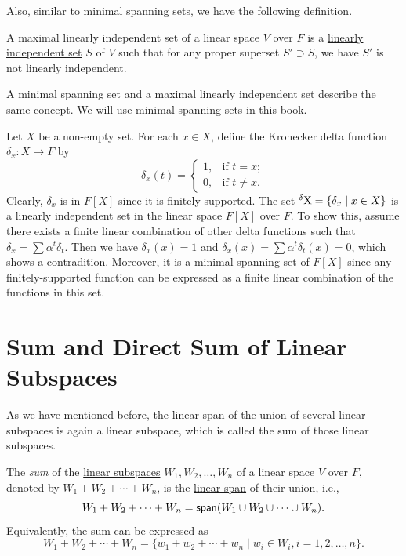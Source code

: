 Also, similar to minimal spanning sets, we have the following definition.

\begin{definition}\label{def:maximal_linearly_independent_set}
  A maximal linearly independent set of a linear space $V$ over $F$ is a \hyperref[def:linear_independent_set]{linearly independent set} $S$ of $V$ such that for any proper superset $S' \supset S$, we have $S'$ is not linearly independent.  
\end{definition}

\begin{remark}
  A minimal spanning set and a maximal linearly independent set describe the same concept. We will use minimal spanning sets in this book. 
\end{remark}

\begin{example}
  Let $X$ be a non-empty set. For each $x \in X$, define the Kronecker delta function $\delta_x \colon X \to F$ by
  \begin{equation}\label{eq:delta_function}
    \delta_x(t) = \begin{cases}
      1, & \text{if } t = x; \\
      0, & \text{if } t \neq x.
    \end{cases}
  \end{equation}
  Clearly, $\delta_x$ is in $F[X]$ since it is finitely supported. The set $\operatorname{{}^{\delta} X} = \{ \delta_x \mid x \in X \}$ is a linearly independent set in the linear space $F[X]$ over $F$. To show this, assume there exists a finite linear combination of other delta functions such that $\delta_x = \sum \alpha^t \delta_t$. Then we have $\delta_x(x) = 1$ and $\delta_x(x) = \sum \alpha^t \delta_t(x) = 0$, which shows a contradition. Moreover, it is a minimal spanning set of $F[X]$ since any finitely-supported function can be expressed as a finite linear combination of the functions in this set.
\end{example}

\section{Sum and Direct Sum of Linear Subspaces}

As we have mentioned before, the linear span of the union of several linear subspaces is again a linear subspace, which is called the sum of those linear subspaces.

\begin{definition}\label{def:sum}
  The \emph{sum} of the \hyperref[def:linear_subspace]{linear subspaces} $W_1, W_2, \ldots, W_n$ of a linear space $V$ over $F$, denoted by $W_1 + W_2 + \cdots + W_n$, is the \hyperref[def:span]{linear span} of their union, i.e.,
  \[
    W_1 + W_2 + \cdots + W_n = \operatorname{\text{\normalfont\sffamily span}}(W_1 \cup W_2 \cup \cdots \cup W_n).
  \]
  Equivalently, the sum can be expressed as
  \[
    W_1 + W_2 + \cdots + W_n = \{ w_1 + w_2 + \cdots + w_n \mid w_i \in W_i, i = 1, 2, \ldots, n \}.
  \]
\end{definition}

